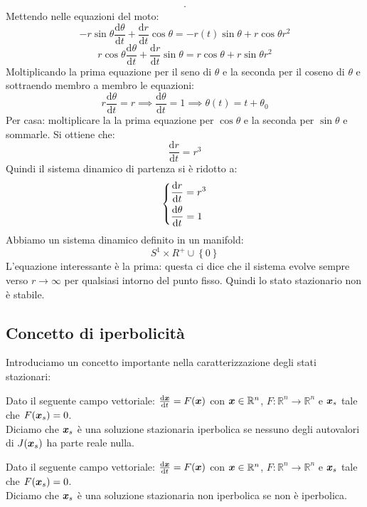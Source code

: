 \begin{exmp}
\[\begin{aligned}
    .\end{aligned}\]
    Mettendo nelle equazioni del moto:
    \[
	-r\sin\theta  \frac{\text{d} \theta}{\text{d} t} + \frac{\text{d} r}{\text{d} t} \cos\theta  = 
	    - r(t)\sin\theta  + r\cos\theta r^2
    \] 
    \[
        r\cos\theta  \frac{\text{d} \theta}{\text{d} t} + \frac{\text{d} r}{\text{d} t} \sin\theta  = r\cos\theta  + r \sin\theta r^2
    \] 
    Moltiplicando la prima equazione per il seno di $\theta$ e la seconda per il coseno di $\theta$ e sottraendo membro a membro le equazioni:
    \[
	r \frac{\text{d} \theta}{\text{d} t} = r \implies  \frac{\text{d} \theta}{\text{d} t} = 1 \implies  \theta (t)=t + \theta_0
    \] 
    Per casa: moltiplicare la la prima equazione per $\cos\theta$ e la seconda per $\sin\theta$ e sommarle. Si ottiene che:
    \[
        \frac{\text{d} r}{\text{d} t} = r^3
    \] 
    Quindi il sistema dinamico di partenza si è ridotto a:
    \[\begin{dcases}
        \frac{\text{d} r}{\text{d} t} = r^3\\
	\frac{\text{d} \theta}{\text{d} t} =1
    \end{dcases}\] 
    Abbiamo un sistema dinamico definito in un manifold: 
    \[
        S^1 \times R^+ \cup \left\{0\right\}
    \] 
    L'equazione interessante è la prima: questa ci dice che il sistema evolve sempre verso $r \to \infty$ per qualsiasi intorno del punto fisso. Quindi lo stato stazionario non è stabile.
\end{exmp}
\noindent
\subsection{Concetto di iperbolicità}%
\label{sub:Concetto di iperbolicità}
Introduciamo un concetto importante nella caratterizzazione degli stati stazionari:
\begin{defn}
    Dato il seguente campo vettoriale: $\frac{\text{d} \boldsymbol{x}}{\text{d} t} = F(\boldsymbol{x})$ con $\boldsymbol{x}\in\mathbb{R}^n$, $F:\mathbb{R}^n \to \mathbb{R}^n$ e $\boldsymbol{x}_s$ tale che $F(\boldsymbol{x}_s)=0$.\\
    Diciamo che $\boldsymbol{x}_s$ è una soluzione stazionaria iperbolica se nessuno degli autovalori di $J(\boldsymbol{x}_s)$ ha parte reale nulla.
\end{defn}
\noindent
\begin{defn}
    Dato il seguente campo vettoriale: $\frac{\text{d} \boldsymbol{x}}{\text{d} t} = F(\boldsymbol{x})$ con $\boldsymbol{x}\in\mathbb{R}^n$, $F:\mathbb{R}^n \to \mathbb{R}^n$ e $\boldsymbol{x}_s$ tale che $F(\boldsymbol{x}_s)=0$.\\
    Diciamo che $\boldsymbol{x}_s$ è una soluzione stazionaria non iperbolica se non è iperbolica.
\end{defn}
\noindent
